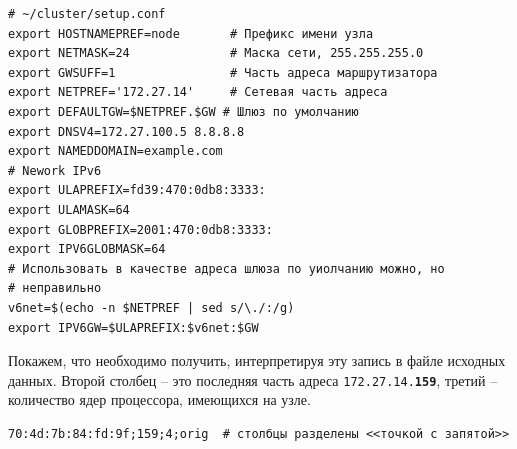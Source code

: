 \documentclass[12pt]{article}
\begin{document}
\begin{verbatim}
# ~/cluster/setup.conf
export HOSTNAMEPREF=node       # Префикс имени узла
export NETMASK=24              # Маска сети, 255.255.255.0
export GWSUFF=1                # Часть адреса маршрутизатора
export NETPREF='172.27.14'     # Сетевая часть адреса
export DEFAULTGW=$NETPREF.$GW # Шлюз по умолчанию
export DNSV4=172.27.100.5 8.8.8.8
export NAMEDDOMAIN=example.com
# Nework IPv6
export ULAPREFIX=fd39:470:0db8:3333:
export ULAMASK=64
export GLOBPREFIX=2001:470:0db8:3333:
export IPV6GLOBMASK=64
# Использовать в качестве адреса шлюза по уиолчанию можно, но
# неправильно
v6net=$(echo -n $NETPREF | sed s/\./:/g)
export IPV6GW=$ULAPREFIX:$v6net:$GW
\end{verbatim}

Покажем, что необходимо получить, интерпретируя эту запись в файле исходных данных. Второй столбец -- это последняя часть адреса \texttt{172.27.14.\textbf{159}}, третий -- количество ядер процессора, имеющихся на узле.
\begin{verbatim}
70:4d:7b:84:fd:9f;159;4;orig  # столбцы разделены <<точкой с запятой>>
\end{verbatim}
\end{document}
